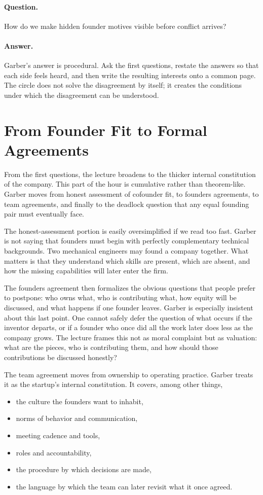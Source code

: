 \paragraph{Question.} How do we make hidden founder motives visible before conflict arrives?

\paragraph{Answer.} Garber's answer is procedural. Ask the first questions, restate the answers so that each side feels heard, and then write the resulting interests onto a common page. The circle does not solve the disagreement by itself; it creates the conditions under which the disagreement can be understood.

\section{From Founder Fit to Formal Agreements}

From the first questions, the lecture broadens to the thicker internal constitution of the company. This part of the hour is cumulative rather than theorem-like. Garber moves from honest assessment of cofounder fit, to founders agreements, to team agreements, and finally to the deadlock question that any equal founding pair must eventually face.

The honest-assessment portion is easily oversimplified if we read too fast. Garber is not saying that founders must begin with perfectly complementary technical backgrounds. Two mechanical engineers may found a company together. What matters is that they understand which skills are present, which are absent, and how the missing capabilities will later enter the firm.

The founders agreement then formalizes the obvious questions that people prefer to postpone: who owns what, who is contributing what, how equity will be discussed, and what happens if one founder leaves. Garber is especially insistent about this last point. One cannot safely defer the question of what occurs if the inventor departs, or if a founder who once did all the work later does less as the company grows. The lecture frames this not as moral complaint but as valuation: what are the pieces, who is contributing them, and how should those contributions be discussed honestly?

The team agreement moves from ownership to operating practice. Garber treats it as the startup's internal constitution. It covers, among other things,
\begin{itemize}
\item the culture the founders want to inhabit,
\item norms of behavior and communication,
\item meeting cadence and tools,
\item roles and accountability,
\item the procedure by which decisions are made,
\item the language by which the team can later revisit what it once agreed.
\end{itemize}

